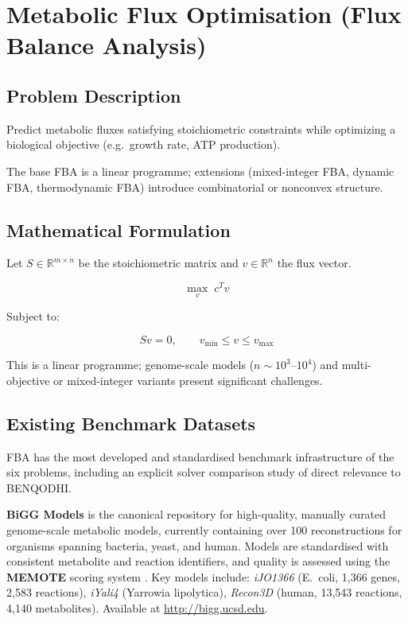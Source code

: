 \documentclass[11pt]{article}
\begin{document}
\section{Metabolic Flux Optimisation (Flux Balance Analysis)}

\subsection*{Problem Description}

Predict metabolic fluxes satisfying stoichiometric constraints while optimizing a 
biological objective (e.g.\ growth rate, ATP production).

The base FBA is a linear programme; extensions (mixed-integer FBA, dynamic FBA,
thermodynamic FBA) introduce combinatorial or nonconvex structure.

\subsection*{Mathematical Formulation}

Let $S \in \mathbb{R}^{m \times n}$ be the stoichiometric matrix and 
$v \in \mathbb{R}^n$ the flux vector.

\[
\max_{v} \; c^T v
\]

Subject to:

\[
S v = 0, \qquad v_{\min} \le v \le v_{\max}
\]

This is a linear programme; genome-scale models ($n \sim 10^3$--$10^4$) and 
multi-objective or mixed-integer variants present significant challenges.

\subsection*{Existing Benchmark Datasets}

FBA has the most developed and standardised benchmark infrastructure of the six problems,
including an explicit solver comparison study of direct relevance to BENQODHI.

\textbf{BiGG Models} \cite{BiGG2016,BiGG2020} is the canonical repository for
high-quality, manually curated genome-scale metabolic models, currently containing over
100 reconstructions for organisms spanning bacteria, yeast, and human. Models are
standardised with consistent metabolite and reaction identifiers, and quality is assessed
using the \textbf{MEMOTE} scoring system \cite{MEMOTE2020}. Key models include:
\textit{iJO1366} (E.~coli, 1{,}366 genes, 2{,}583 reactions), \textit{iYali4}
(Yarrowia lipolytica), \textit{Recon3D} (human, 13{,}543 reactions, 4{,}140 metabolites).
Available at \url{http://bigg.ucsd.edu}.
\end{document}
